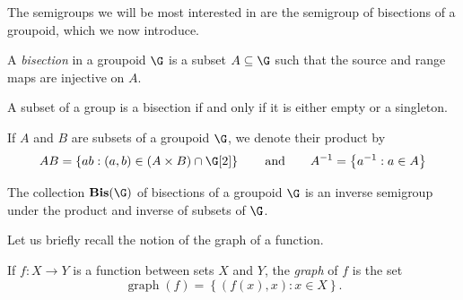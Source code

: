 The semigroups we will be most interested in are the semigroup of bisections of a groupoid, which we now introduce.

\begin{definition}
A \emph{bisection} in a groupoid $\G$ is a subset $A\subseteq\G$ such that the source and range maps are injective on $A$.%
\end{definition}

\begin{example}
A subset of a group is a bisection if and only if it is either empty or a singleton.
\end{example}

If $A$ and $B$ are subsets of a groupoid $\G$, we denote their product by
\[AB=\left\{ab:(a,b)\in (A\times B)\cap\G[2]\right\}\qquad\text{and}\qquad A^{-1}=\left\{a^{-1}:a\in A\right\}\]

\begin{example}
The collection $\operatorname{\mathbf{Bis}}(\G)$ of bisections of a groupoid $\G$ is an inverse semigroup under the product and inverse of subsets of $\G$.%
\end{example}

Let us briefly recall the notion of the graph of a function.

\begin{definition}\label{definitiongraphoffunction}
If $f:X\to Y$ is a function between sets $X$ and $Y$, the \emph{graph} of $f$ is the set
\[\operatorname{graph}(f)=\left\{(f(x),x):x\in X\right\}.\]
\end{definition}

